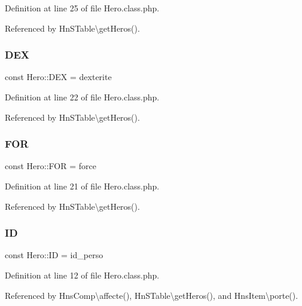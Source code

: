 Definition at line 25 of file Hero.\+class.\+php.



Referenced by Hn\+S\+Table\textbackslash{}get\+Heros().

\mbox{\label{class_hero_a15a42da90fc7710dd1877d70e0485843}} 
\subsubsection{\texorpdfstring{D\+EX}{DEX}}
{\footnotesize\ttfamily const Hero\+::\+D\+EX = \textquotesingle{}dexterite\textquotesingle{}}



Definition at line 22 of file Hero.\+class.\+php.



Referenced by Hn\+S\+Table\textbackslash{}get\+Heros().

\mbox{\label{class_hero_a6e327c17f3ea677e5ad68061be4066f6}} 
\subsubsection{\texorpdfstring{F\+OR}{FOR}}
{\footnotesize\ttfamily const Hero\+::\+F\+OR = \textquotesingle{}force\textquotesingle{}}



Definition at line 21 of file Hero.\+class.\+php.



Referenced by Hn\+S\+Table\textbackslash{}get\+Heros().

\mbox{\label{class_hero_a34e910a3350b6c60783b2d14ed59deb5}} 
\subsubsection{\texorpdfstring{ID}{ID}}
{\footnotesize\ttfamily const Hero\+::\+ID = \textquotesingle{}id\+\_\+perso\textquotesingle{}}



Definition at line 12 of file Hero.\+class.\+php.



Referenced by Hns\+Comp\textbackslash{}affecte(), Hn\+S\+Table\textbackslash{}get\+Heros(), and Hns\+Item\textbackslash{}porte().

